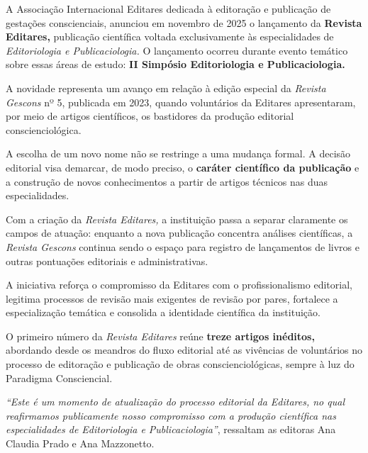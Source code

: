 \documentclass{gescons}
\begin{document}
    \begin{multicols}{2}


A Associação Internacional Editares dedicada à editoração e publicação de gestações conscienciais, anunciou em novembro de 2025 o lançamento da \textbf{Revista Editares,} publicação científica voltada exclusivamente às especialidades de \emph{Editoriologia e Publicaciologia.} O lançamento ocorreu durante evento temático sobre essas áreas de estudo: \textbf{II Simpósio Editoriologia e Publicaciologia.}

A novidade representa um avanço em relação à edição especial da \emph{Revista Gescons} nº 5, publicada em 2023, quando voluntários da Editares apresentaram, por meio de artigos científicos, os bastidores da produção editorial conscienciológica.

A escolha de um novo nome não se restringe a uma mudança formal. A decisão editorial visa demarcar, de modo preciso, o \textbf{caráter científico da publicação} e a construção de novos conhecimentos a partir de artigos técnicos nas duas especialidades.

Com a criação da \emph{Revista Editares,} a instituição passa a separar claramente os campos de atuação: enquanto a nova publicação concentra análises científicas, a \emph{Revista Gescons} continua sendo o espaço para registro de lançamentos de livros e outras pontuações editoriais e administrativas.

A iniciativa reforça o compromisso da Editares com o profissionalismo editorial, legitima processos de revisão mais exigentes de revisão por pares, fortalece a especialização temática e consolida a identidade científica da instituição.

O primeiro número da \emph{Revista Editares} reúne \textbf{treze artigos inéditos,} abordando desde os meandros do fluxo editorial até as vivências de voluntários no processo de editoração e publicação de obras conscienciológicas, sempre à luz do Paradigma Consciencial.

\emph{``Este é um momento de atualização do processo editorial da Editares, no qual reafirmamos publicamente nosso compromisso com a produção científica nas especialidades de Editoriologia e Publicaciologia''}, ressaltam as editoras Ana Claudia Prado e Ana Mazzonetto.









    \end{multicols}
\end{document}
